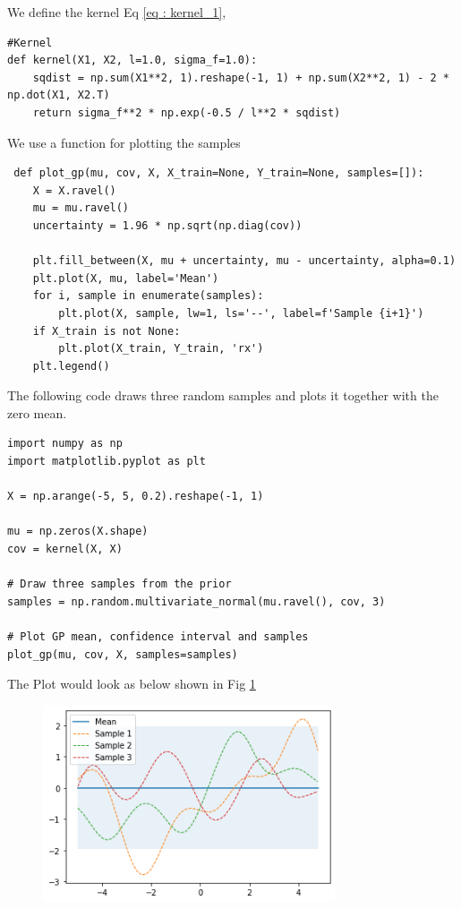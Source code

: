 \documentclass[journal,12pt,twocolumn]{IEEEtran}
\begin{document}
We define the kernel Eq \eqref{eq : kernel_1},
\begin{lstlisting}
#Kernel 
def kernel(X1, X2, l=1.0, sigma_f=1.0):
    sqdist = np.sum(X1**2, 1).reshape(-1, 1) + np.sum(X2**2, 1) - 2 * np.dot(X1, X2.T)
    return sigma_f**2 * np.exp(-0.5 / l**2 * sqdist)
\end{lstlisting}
We use a function for plotting the samples
\begin{lstlisting}
 def plot_gp(mu, cov, X, X_train=None, Y_train=None, samples=[]):
    X = X.ravel()
    mu = mu.ravel()
    uncertainty = 1.96 * np.sqrt(np.diag(cov))
    
    plt.fill_between(X, mu + uncertainty, mu - uncertainty, alpha=0.1)
    plt.plot(X, mu, label='Mean')
    for i, sample in enumerate(samples):
        plt.plot(X, sample, lw=1, ls='--', label=f'Sample {i+1}')
    if X_train is not None:
        plt.plot(X_train, Y_train, 'rx')
    plt.legend()
\end{lstlisting}
The following code draws three random samples and plots it together with the zero mean.
\begin{lstlisting}
import numpy as np
import matplotlib.pyplot as plt

X = np.arange(-5, 5, 0.2).reshape(-1, 1)

mu = np.zeros(X.shape)
cov = kernel(X, X)

# Draw three samples from the prior
samples = np.random.multivariate_normal(mu.ravel(), cov, 3)

# Plot GP mean, confidence interval and samples 
plot_gp(mu, cov, X, samples=samples)
\end{lstlisting}
The Plot would look as below shown in Fig \ref{fig:2} 
\begin{figure}[!h]
\begin{center}
\includegraphics[width=3.4in]{figs/fig2.png}
\end{center}
\caption{}
\label{fig:2}
\end{figure}
\end{document}
